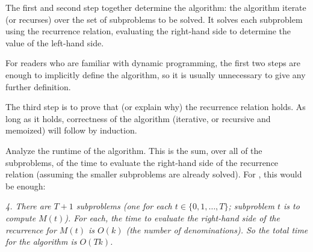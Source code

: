 \begin{description}
  The first and second step together determine the algorithm:
  the algorithm iterate (or recurses) over the set of subproblems
  to be solved.  It solves each subproblem using the recurrence relation,
  evaluating the right-hand side to determine the value of the left-hand side.

  For readers who are familiar with dynamic programming,
  the first two steps are enough to implicitly define the algorithm,
  so it is usually unnecessary to give any further definition.
  
\item[3. Prove correctness.]
  The third step is to prove that (or explain why) the recurrence relation holds. 
  As long as it holds,
  correctness of the algorithm (iterative, or recursive and memoized)
  will follow by induction.
  
\item[4. Bound the run time.] Analyze the runtime of the algorithm.
  This is the sum, over all of the subproblems,
  of the time to evaluate
  the right-hand side of the recurrence relation
  (assuming the smaller subproblems are already solved).
  For , this would be enough:
  
  \medskip

  \emph{
    4. There are $T+1$ subproblems (one for each $t\in\{0,1,\ldots,T\}$;
    subproblem $t$ is to compute $M(t)$).
    For each, the time to evaluate the right-hand side of the recurrence for $M(t)$ is $O(k)$
    (the number of denominations).
    So the total time for the algorithm is $O(T k)$.
  }
\end{description}


